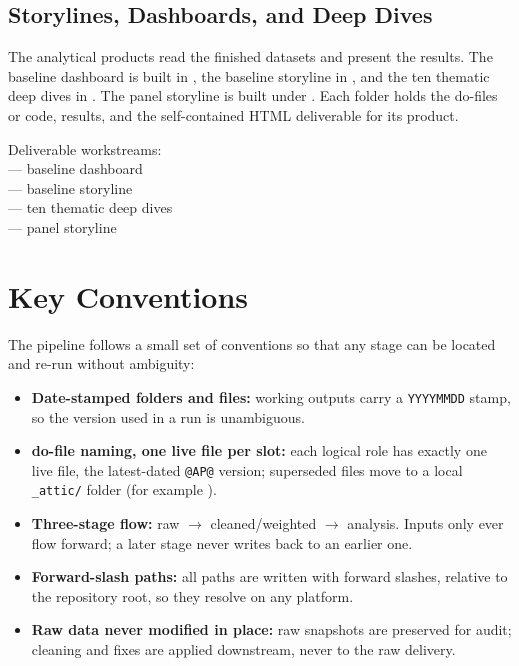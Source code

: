 \subsection{Storylines, Dashboards, and Deep Dives}

The analytical products read the finished datasets and present the results. The
baseline dashboard is built in , the baseline storyline in
, and the ten thematic deep dives in
. The panel storyline is built under
. Each folder holds the do-files or code, results, and the
self-contained HTML deliverable for its product.

\begin{refbox}
Deliverable workstreams:\\
 --- baseline dashboard\\
 --- baseline storyline\\
 --- ten thematic deep dives\\
 --- panel storyline
\end{refbox}

\section{Key Conventions}

The pipeline follows a small set of conventions so that any stage can be located
and re-run without ambiguity:

\begin{itemize}
  \item \textbf{Date-stamped folders and files:} working outputs carry a
        \verb|YYYYMMDD| stamp, so the version used in a run is unambiguous.
  \item \textbf{ do-file naming, one live file per slot:} each logical
        role has exactly one live file, the latest-dated \verb|@AP@| version;
        superseded files move to a local \texttt{\_attic/} folder (for example
        ).
  \item \textbf{Three-stage flow:} raw $\rightarrow$ cleaned/weighted
        $\rightarrow$ analysis. Inputs only ever flow forward; a later stage
        never writes back to an earlier one.
  \item \textbf{Forward-slash paths:} all paths are written with forward slashes,
        relative to the repository root, so they resolve on any platform.
  \item \textbf{Raw data never modified in place:} raw snapshots are preserved
        for audit; cleaning and fixes are applied downstream, never to the raw
        delivery.
\end{itemize}
